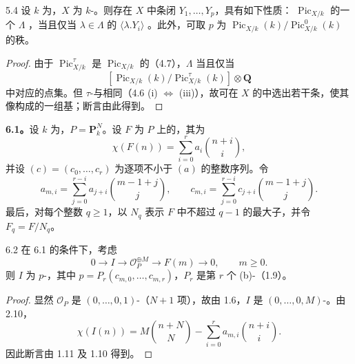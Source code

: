\begin{SGAresult}{}{5.4}
设 $k$ 为，$X$ 为 $k$-。则存在 $X$ 中条闭 $Y_1,\ldots,Y_p$，具有如下性质： $\operatorname{Pic}_{X/k}$ 的一个 $\Lambda$ ，当且仅当 $\lambda\in\Lambda$ 的 $\langle\lambda.Y_i\rangle$ 。此外，可取 $p$ 为 $\operatorname{Pic}_{X/k}(k)/\operatorname{Pic}^0_{X/k}(k)$ 的秩。
\end{SGAresult}
\begin{proof}
由于 $\operatorname{Pic}^\tau_{X/k}$ 是 $\operatorname{Pic}_{X/k}$ 的（4.7），$\Lambda$ 当且仅当
\[[\operatorname{Pic}_{X/k}(k)/\operatorname{Pic}^\tau_{X/k}(k)]\otimes\mathbf Q\]
中对应的点集。但 $\tau$-与相同（4.6 (i) $\Longleftrightarrow$ (iii)），故可在 $X$ 的中选出若干条，使其像构成的一组基；断言由此得到。
\end{proof}
\textbf{6.1。}设 $k$ 为，$P=\mathbf P^N_k$。设 $F$ 为 $P$ 上的，其为
\[\chi(F(n))=\sum_{i=0}^r a_i\binom{n+i}{i},\]
并设 $(c)=(c_0,\ldots,c_r)$ 为逐项不小于 $(a)$ 的整数序列。令
\[a_{m,i}=\sum_{j=0}^{r-i}a_{j+i}\binom{m-1+j}{j},\qquad
c_{m,i}=\sum_{j=0}^{r-i}c_{j+i}\binom{m-1+j}{j}.\]
最后，对每个整数 $q\geq1$，以 $N_q$ 表示 $F$ 中不超过 $q-1$ 的最大子，并令 $F_q=F/N_q$。
\begin{SGAresult}{}{6.2}
在 6.1 的条件下，考虑
\[0\longrightarrow I\longrightarrow\mathscr O_P^{\oplus M}\longrightarrow F(m)\longrightarrow0,\qquad m\geq0.\]
则 $I$ 为 $p$-，其中 $p=P_r(c_{m,0},\ldots,c_{m,r})$，$P_r$ 是第 $r$ 个 (b)-（1.9）。
\end{SGAresult}
\begin{proof}
显然 $\mathscr O_P$ 是 $(0,\ldots,0,1)$-（$N+1$ 项），故由 1.6，$I$ 是 $(0,\ldots,0,M)$-。由 2.10，
\[\chi(I(n))=M\binom{n+N}{N}-\sum_{i=0}^r a_{m,i}\binom{n+i}{i}.\]
因此断言由 1.11 及 1.10 得到。
\end{proof}
